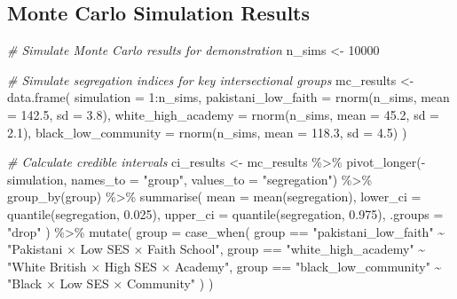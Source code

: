 \documentclass[
]{article}
\newenvironment{Shaded}{\begin{snugshade}}{\end{snugshade}}
\newcommand{\AttributeTok}[1]{\textcolor[rgb]{0.77,0.63,0.00}{#1}}
\newcommand{\CommentTok}[1]{\textcolor[rgb]{0.56,0.35,0.01}{\textit{#1}}}
\newcommand{\DecValTok}[1]{\textcolor[rgb]{0.00,0.00,0.81}{#1}}
\newcommand{\FloatTok}[1]{\textcolor[rgb]{0.00,0.00,0.81}{#1}}
\newcommand{\FunctionTok}[1]{\textcolor[rgb]{0.00,0.00,0.00}{#1}}
\newcommand{\NormalTok}[1]{#1}
\newcommand{\OtherTok}[1]{\textcolor[rgb]{0.56,0.35,0.01}{#1}}
\newcommand{\SpecialCharTok}[1]{\textcolor[rgb]{0.00,0.00,0.00}{#1}}
\newcommand{\StringTok}[1]{\textcolor[rgb]{0.31,0.60,0.02}{#1}}
\begin{document}
\hypertarget{monte-carlo-simulation-results}{%
\subsection{Monte Carlo Simulation
Results}\label{monte-carlo-simulation-results}}

\begin{Shaded}
\begin{Highlighting}[]
\CommentTok{\# Simulate Monte Carlo results for demonstration}
\NormalTok{n\_sims }\OtherTok{\textless{}{-}} \DecValTok{10000}

\CommentTok{\# Simulate segregation indices for key intersectional groups}
\NormalTok{mc\_results }\OtherTok{\textless{}{-}} \FunctionTok{data.frame}\NormalTok{(}
  \AttributeTok{simulation =} \DecValTok{1}\SpecialCharTok{:}\NormalTok{n\_sims,}
  \AttributeTok{pakistani\_low\_faith =} \FunctionTok{rnorm}\NormalTok{(n\_sims, }\AttributeTok{mean =} \FloatTok{142.5}\NormalTok{, }\AttributeTok{sd =} \FloatTok{3.8}\NormalTok{),}
  \AttributeTok{white\_high\_academy =} \FunctionTok{rnorm}\NormalTok{(n\_sims, }\AttributeTok{mean =} \FloatTok{45.2}\NormalTok{, }\AttributeTok{sd =} \FloatTok{2.1}\NormalTok{),}
  \AttributeTok{black\_low\_community =} \FunctionTok{rnorm}\NormalTok{(n\_sims, }\AttributeTok{mean =} \FloatTok{118.3}\NormalTok{, }\AttributeTok{sd =} \FloatTok{4.5}\NormalTok{)}
\NormalTok{)}

\CommentTok{\# Calculate credible intervals}
\NormalTok{ci\_results }\OtherTok{\textless{}{-}}\NormalTok{ mc\_results }\SpecialCharTok{\%\textgreater{}\%}
  \FunctionTok{pivot\_longer}\NormalTok{(}\SpecialCharTok{{-}}\NormalTok{simulation, }\AttributeTok{names\_to =} \StringTok{"group"}\NormalTok{, }\AttributeTok{values\_to =} \StringTok{"segregation"}\NormalTok{) }\SpecialCharTok{\%\textgreater{}\%}
  \FunctionTok{group\_by}\NormalTok{(group) }\SpecialCharTok{\%\textgreater{}\%}
  \FunctionTok{summarise}\NormalTok{(}
    \AttributeTok{mean =} \FunctionTok{mean}\NormalTok{(segregation),}
    \AttributeTok{lower\_ci =} \FunctionTok{quantile}\NormalTok{(segregation, }\FloatTok{0.025}\NormalTok{),}
    \AttributeTok{upper\_ci =} \FunctionTok{quantile}\NormalTok{(segregation, }\FloatTok{0.975}\NormalTok{),}
    \AttributeTok{.groups =} \StringTok{"drop"}
\NormalTok{  ) }\SpecialCharTok{\%\textgreater{}\%}
  \FunctionTok{mutate}\NormalTok{(}
    \AttributeTok{group =} \FunctionTok{case\_when}\NormalTok{(}
\NormalTok{      group }\SpecialCharTok{==} \StringTok{"pakistani\_low\_faith"} \SpecialCharTok{\textasciitilde{}} \StringTok{"Pakistani × Low SES × Faith School"}\NormalTok{,}
\NormalTok{      group }\SpecialCharTok{==} \StringTok{"white\_high\_academy"} \SpecialCharTok{\textasciitilde{}} \StringTok{"White British × High SES × Academy"}\NormalTok{,}
\NormalTok{      group }\SpecialCharTok{==} \StringTok{"black\_low\_community"} \SpecialCharTok{\textasciitilde{}} \StringTok{"Black × Low SES × Community"}
\NormalTok{    )}
\NormalTok{  )}


\end{Highlighting}
\end{Shaded}
\end{document}
